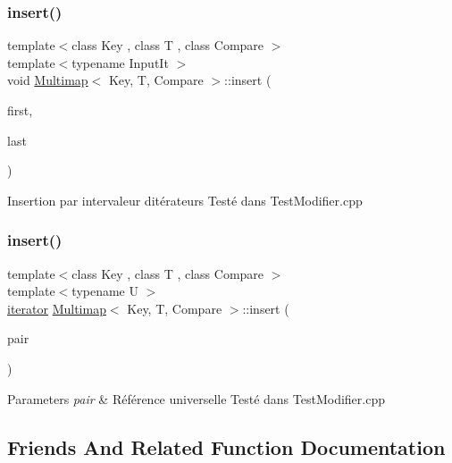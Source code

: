 \subsubsection{\texorpdfstring{insert()}{insert()}\hspace{0.1cm}{\footnotesize\ttfamily [3/4]}}
{\footnotesize\ttfamily template$<$class Key , class T , class Compare $>$ \\
template$<$typename Input\+It $>$ \\
void \hyperlink{classMultimap}{Multimap}$<$ Key, T, Compare $>$\+::insert (\begin{DoxyParamCaption}\item[{Input\+It}]{first,  }\item[{Input\+It}]{last }\end{DoxyParamCaption})\hspace{0.3cm}{\ttfamily [inline]}}

Insertion par intervaleur d\textquotesingle{}itérateurs Testé dans Test\+Modifier.\+cpp \mbox{\label{classMultimap_ad4cd112230c4781aa25f66d78f858dd6}} 
\subsubsection{\texorpdfstring{insert()}{insert()}\hspace{0.1cm}{\footnotesize\ttfamily [4/4]}}
{\footnotesize\ttfamily template$<$class Key , class T , class Compare $>$ \\
template$<$typename U $>$ \\
\hyperlink{classMultimapIterator}{iterator} \hyperlink{classMultimap}{Multimap}$<$ Key, T, Compare $>$\+::insert (\begin{DoxyParamCaption}\item[{U \&\&}]{pair }\end{DoxyParamCaption})\hspace{0.3cm}{\ttfamily [inline]}}


\begin{DoxyParams}{Parameters}
{\em pair} & Référence universelle Testé dans Test\+Modifier.\+cpp \\
\hline
\end{DoxyParams}


\subsection{Friends And Related Function Documentation}
\mbox{\label{classMultimap_a3a9cc0a79670c0bf02221d1cde83e1e0}} 
